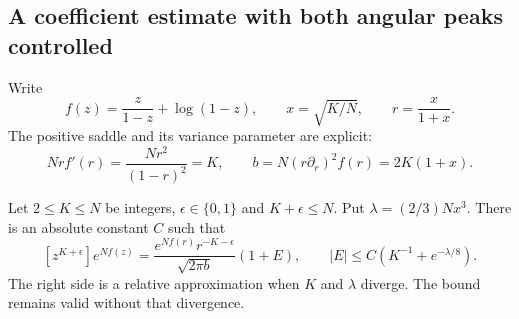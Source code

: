 \subsection{A coefficient estimate with both angular peaks controlled}

Write
\[
f(z)=\frac{z}{1-z}+\log(1-z),\qquad
x=\sqrt{K/N},\qquad r=\frac{x}{1+x}.
\]
The positive saddle and its variance parameter are explicit:
\begin{equation}\label{eq:saddleequation}
Nrf'(r)=\frac{Nr^2}{(1-r)^2}=K,\qquad
b=N(r\partial_r)^2f(r)=2K(1+x).
\end{equation}

\begin{lemma}\label{lem:saddle}
Let $2\le K\le N$ be integers, $\epsilon\in\{0,1\}$ and $K+\epsilon\le N$. Put $\lambda=(2/3)Nx^3$. There is an absolute constant $C$ such that
\begin{equation}\label{eq:saddlecoefficient}
[z^{K+\epsilon}]e^{Nf(z)}
=\frac{e^{Nf(r)}r^{-K-\epsilon}}{\sqrt{2\pi b}}(1+E),
\qquad |E|\le C\left(K^{-1}+e^{-\lambda/8}\right).
\end{equation}
The right side is a relative approximation when $K$ and $\lambda$ diverge. The bound remains valid without that divergence.
\end{lemma}
